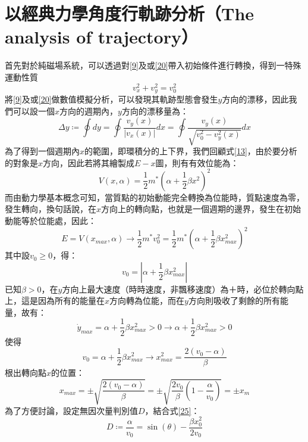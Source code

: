 \documentclass[12pt]{article}
\begin{document}
\section{以經典力學角度行軌跡分析（The analysis of trajectory）}
首先對於純磁場系統，可以透過對\eqref{9}及或\eqref{20}帶入初始條件進行轉換，得到一特殊運動性質\[v_x^2+v_y^2=v_0^2\]
將\eqref{9}及或\eqref{20}做數值模擬分析，可以發現其軌跡型態會發生$y$方向的漂移，因此我們可以設一個$x$方向的週期內，$y$方向的漂移量為：
\begin{equation}
    \Delta y\coloneqq\oint{dy}=\oint{\frac{v_y(x)}{|v_x(x)|}}dx=\oint{\frac{v_y(x)}{\sqrt{v_0^2-v_y^2(x)}}}dx
\end{equation}
為了得到一個週期內$x$的範圍，即環積分的上下界，我們回顧式\eqref{13}，由於要分析的對象是$x$方向，因此若將其繪製成$E-x$圖，則有有效位能為：
\begin{equation}
    V(x,\alpha)=\frac12 m^*\left(\alpha+\frac12\beta x^2\right)^2
\end{equation}
而由動力學基本概念可知，當質點的初始動能完全轉換為位能時，質點速度為零，發生轉向，換句話說，在$x$方向上的轉向點，也就是一個週期的邊界，發生在初始動能等於位能處，因此：
\begin{equation}
    E=V(x_{max},\alpha)\to\frac12 m^*v_0^2=\frac12m^*\left(\alpha+\frac12\beta x_{max}^2\right)^2
\end{equation}
其中設$v_0\geq 0$，得：
\begin{equation}
    v_0=\left|\alpha+\frac12\beta x_{max}^2\right|
\end{equation}
已知$\beta>0$，在$y$方向上最大速度（時時速度，非飄移速度）為＋時，必位於轉向點上，這是因為所有的能量在$x$方向轉為位能，而在$y$方向則吸收了剩餘的所有能量，故有：
\begin{equation}
    \dot{y}_{max}=\alpha+\frac12\beta x_{max}^2>0\to\alpha+\frac12\beta x_{max}^2>0
\end{equation}
使得
\begin{equation}
    v_0=\alpha+\frac12\beta x_{max}^2\to x_{max}^2=\frac{2(v_0-\alpha)}{\beta}
\end{equation}
根出轉向點$x$的位置：
\begin{equation}
    x_{max}=\pm\sqrt{\frac{2(v_0-\alpha)}{\beta}}=\pm\sqrt{\frac{2v_0}{\beta}\left(1-\frac{\alpha}{v_0}\right)}=\pm x_m
\end{equation}
為了方便討論，設定無因次量判別值$D$，結合式\eqref{25}：
\begin{equation}
    D\coloneqq\frac{\alpha}{v_0}=\sin{(\theta)}-\frac{\beta x_0^2}{2v_0}
\end{equation}
\end{document}
